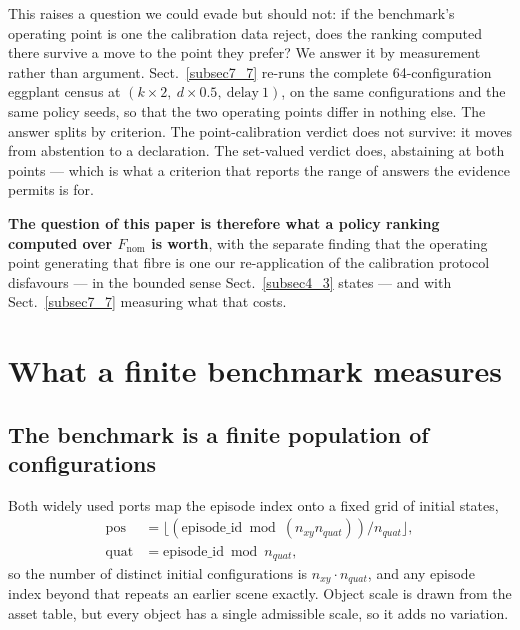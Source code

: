 \documentclass[pdflatex,iicol,sn-apa]{sn-jnl}
\theoremstyle{remark}
\begin{document}
This raises a question we could evade but should not: if the benchmark's operating point is one the
calibration data reject, does the ranking computed there survive a move to the point they prefer? We
answer it by measurement rather than argument. Sect.~\ref{subsec7_7} re-runs the complete
64-configuration eggplant census at $(k{\times}2,\ d{\times}0.5,\ \text{delay}\ 1)$, on the same
configurations and the same policy seeds, so that the two operating points differ in nothing else.
The answer splits by criterion. The point-calibration verdict does not survive: it moves from
abstention to a declaration. The set-valued verdict does, abstaining at both points --- which is
what a criterion that reports the range of answers the evidence permits is for.

\textbf{The question of this paper is therefore what a policy ranking computed over
$F_{\mathrm{nom}}$ is worth}, with the separate finding that the operating point generating that
fibre is one our re-application of the calibration protocol disfavours --- in the bounded sense
Sect.~\ref{subsec4_3} states --- and with Sect.~\ref{subsec7_7} measuring what that costs.

\section{What a finite benchmark measures}\label{sec5}

\subsection{The benchmark is a finite population of configurations}\label{subsec5_1}

Both widely used ports map the episode index onto a fixed grid of initial states,
\begin{align}
\mathrm{pos}  &= \big\lfloor (\mathrm{episode\_id} \bmod (n_{xy} n_{quat})) / n_{quat} \big\rfloor, \\
\mathrm{quat} &= \mathrm{episode\_id} \bmod n_{quat},
\end{align}
so the number of distinct initial configurations is $n_{xy} \cdot n_{quat}$, and any episode index
beyond that repeats an earlier scene exactly. Object scale is drawn from the asset table, but every
object has a single admissible scale, so it adds no variation.
\end{document}
